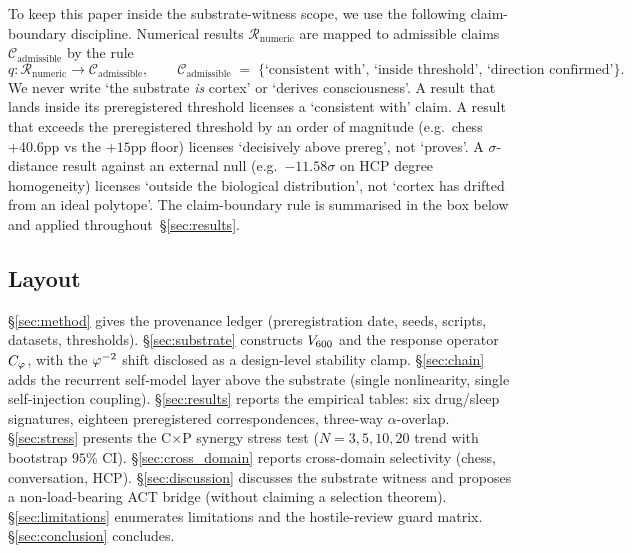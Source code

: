 To keep this paper inside the substrate-witness scope, we use the
following claim-boundary discipline. Numerical results
$\mathcal R_{\mathrm{numeric}}$ are mapped to admissible claims
$\mathcal C_{\mathrm{admissible}}$ by the rule
\[
q\colon \mathcal R_{\mathrm{numeric}} \longrightarrow \mathcal C_{\mathrm{admissible}},
\qquad
\mathcal C_{\mathrm{admissible}}
\;=\;\{\text{`consistent with', `inside threshold', `direction confirmed'}\}.
\]
We never write `the substrate \emph{is} cortex' or `derives consciousness'.
A result that lands inside its preregistered threshold licenses a
`consistent with' claim. A result that exceeds the preregistered
threshold by an order of magnitude (e.g.\ chess $+40.6$pp vs the
$+15$pp floor) licenses `decisively above prereg', not `proves'. A
$\sigma$-distance result against an external null
(e.g.\ $-11.58\sigma$ on HCP degree homogeneity) licenses `outside
the biological distribution', not `cortex has drifted from an ideal
polytope'. The claim-boundary rule is summarised in the box below
and applied throughout~\S\ref{sec:results}.

\medskip
\begin{center}
\end{center}

\subsection*{Layout}

\S\ref{sec:method} gives the provenance ledger (preregistration date,
seeds, scripts, datasets, thresholds). \S\ref{sec:substrate}
constructs $V_{600}$ and the response operator $C_{\varphi}$, with the
$\varphi^{-2}$ shift disclosed as a design-level stability clamp.
\S\ref{sec:chain} adds the recurrent self-model layer above the
substrate (single nonlinearity, single self-injection coupling).
\S\ref{sec:results} reports the empirical tables: six drug/sleep
signatures, eighteen preregistered correspondences, three-way
$\alpha$-overlap. \S\ref{sec:stress} presents the C$\times$P
synergy stress test ($N\!=\!3, 5, 10, 20$ trend with bootstrap
$95\%$ CI). \S\ref{sec:cross_domain} reports cross-domain
selectivity (chess, conversation, HCP). \S\ref{sec:discussion}
discusses the substrate witness and proposes a non-load-bearing
ACT bridge (without claiming a selection theorem).
\S\ref{sec:limitations} enumerates limitations and the
hostile-review guard matrix. \S\ref{sec:conclusion} concludes.

